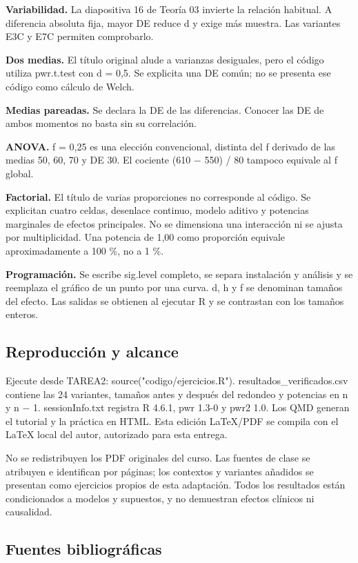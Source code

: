 \documentclass[10pt,a4paper]{article}
\begin{document}
\textbf{Variabilidad.} La diapositiva 16 de Teoría 03 invierte la relación habitual. A diferencia absoluta fija, mayor DE reduce d y exige más muestra. Las variantes E3C y E7C permiten comprobarlo.

\textbf{Dos medias.} El título original alude a varianzas desiguales, pero el código utiliza pwr.t.test con d = 0,5. Se explicita una DE común; no se presenta ese código como cálculo de Welch.

\textbf{Medias pareadas.} Se declara la DE de las diferencias. Conocer las DE de ambos momentos no basta sin su correlación.

\textbf{ANOVA.} f = 0,25 es una elección convencional, distinta del f derivado de las medias 50, 60, 70 y DE 30. El cociente (610 \ensuremath{-} 550) / 80 tampoco equivale al f global.

\textbf{Factorial.} El título de varias proporciones no corresponde al código. Se explicitan cuatro celdas, desenlace continuo, modelo aditivo y potencias marginales de efectos principales. No se dimensiona una interacción ni se ajusta por multiplicidad. Una potencia de 1,00 como proporción equivale aproximadamente a 100 \%, no a 1 \%.

\textbf{Programación.} Se escribe sig.level completo, se separa instalación y análisis y se reemplaza el gráfico de un punto por una curva. d, h y f se denominan tamaños del efecto. Las salidas se obtienen al ejecutar R y se contrastan con los tamaños enteros.

\clearpage
\subsection*{Reproducción y alcance}

Ejecute desde TAREA2: source("codigo/ejercicios.R"). resultados\_verificados.csv contiene las 24 variantes, tamaños antes y después del redondeo y potencias en n y n \ensuremath{-} 1. sessionInfo.txt registra R 4.6.1, pwr 1.3-0 y pwr2 1.0. Los QMD generan el tutorial y la práctica en HTML. Esta edición LaTeX/PDF se compila con el LaTeX local del autor, autorizado para esta entrega.

No se redistribuyen los PDF originales del curso. Las fuentes de clase se atribuyen e identifican por páginas; los contextos y variantes añadidos se presentan como ejercicios propios de esta adaptación. Todos los resultados están condicionados a modelos y supuestos, y no demuestran efectos clínicos ni causalidad.

\clearpage
\subsection*{Fuentes bibliográficas}
\end{document}
